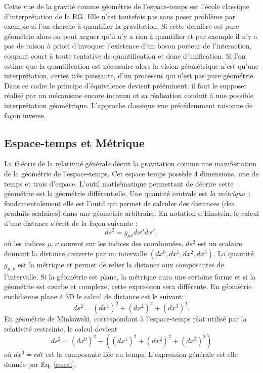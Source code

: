 Cette vue de la gravité comme géométrie de l'espace-temps est l'école classique d'interprétation de la RG. Elle n'est toutefois pas sans poser problème par exemple si l'on cherche à quantifier la gravitation. Si cette dernière est pure géométrie alors on peut arguer qu'il n'y a rien à quantifier et par exemple il n'y a pas de raison à priori d'invoquer l'existence d'un boson porteur de l'interaction, coupant court à toute tentative de quantification et donc d'unification. Si l'on estime que la quantification est nécessaire alors la vision géométrique n'est qu'une interprétation, certes très puissante, d'un processus qui n'est pas pure géométrie. Dans ce cadre le principe d'équivalence devient prééminent: il faut le supposer réalisé par un mécanisme encore inconnu et sa réalisation conduit à une possible interprétation géométrique. L'approche classique vue précédemment raisonne de façon inverse.

\subsection{Espace-temps et Métrique}
La théorie de la relativité générale décrit la gravitation comme une manifestation de la géométrie de l'espace-temps. Cet espace temps possède 4 dimensions, une de temps et trois d'espace. L'outil mathématique permettant de décrire cette géométrie est la géométrie différentielle. Une quantité centrale est \textit{la métrique}~: fondamentalement elle est l'outil qui permet de calculer des distances (des produits scalaires) dans une géométrie arbitraire. En notation d'Einstein, le calcul d'une distance s'écrit de la façon suivante :
\begin{equation}
ds^2=g_{\mu\nu}dx^\mu dx^\nu,
\label{e:scal}
\end{equation}
où les indices $\mu,\nu$ courent sur les indices des coordonnées, $ds^2$ est un scalaire donnant la distance couverte par un intervalle $(dx^0,dx^1,dx^2,dx^3)$. La quantité $g_{\mu,\nu}$ est la métrique et permet de relier la distance aux composantes de l'intervalle. Si la géométrie est plane, la métrique aura une certaine forme et si la géométrie est courbe et complexe, cette expression sera différente. En géométrie euclidienne plane à 3D le calcul de distance est le suivant:
\begin{equation}
ds^2=(dx^1)^2+(dx^2)^2+(dx^3)^2.
\end{equation} 
En géométrie de Minkowski, correspondant à l'espace-temps plat utilisé par la relativité restreinte, le calcul devient
\begin{equation}
ds^2=(dx^0)^2 -((dx^1)^2+(dx^2)^2+(dx^3)^2)
\end{equation} 
où $dx^0=cdt$ est la composante liée au temps. L'expression générale est elle donnée par Eq. \ref{e:scal}.

